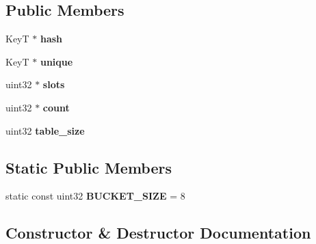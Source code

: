 \subsection*{Public Members}
\begin{DoxyCompactItemize}
\item 
\mbox{\label{structcugar_1_1cuda_1_1_sync_free_hash_map_a50c6949dfa588cc87ee5714aa5c39e04}} 
KeyT $\ast$ {\bfseries hash}
\item 
\mbox{\label{structcugar_1_1cuda_1_1_sync_free_hash_map_aaec8b0cb43f4637002683185763db29f}} 
KeyT $\ast$ {\bfseries unique}
\item 
\mbox{\label{structcugar_1_1cuda_1_1_sync_free_hash_map_a7380b9a189293d527ea985120ad9c5e1}} 
uint32 $\ast$ {\bfseries slots}
\item 
\mbox{\label{structcugar_1_1cuda_1_1_sync_free_hash_map_a6907f1d730a0fba87abef335464e373a}} 
uint32 $\ast$ {\bfseries count}
\item 
\mbox{\label{structcugar_1_1cuda_1_1_sync_free_hash_map_afd20f61eaa1f4553dfbd31c3dabff1fc}} 
uint32 {\bfseries table\+\_\+size}
\end{DoxyCompactItemize}
\subsection*{Static Public Members}
\begin{DoxyCompactItemize}
\item 
\mbox{\label{structcugar_1_1cuda_1_1_sync_free_hash_map_a188d9267ec2a6589f901d0eed7044fa1}} 
static const uint32 {\bfseries B\+U\+C\+K\+E\+T\+\_\+\+S\+I\+ZE} = 8
\end{DoxyCompactItemize}


\subsection{Constructor \& Destructor Documentation}
\mbox{\label{structcugar_1_1cuda_1_1_sync_free_hash_map_a27411b5878e84ffb98ddcde4ef660409}} 
